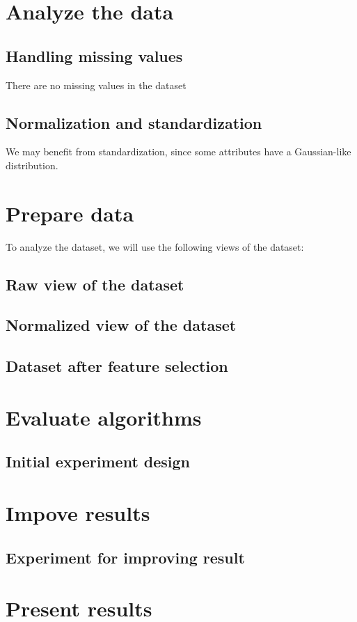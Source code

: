 \chapter{Analyze the data}
\section{Handling missing values}
There are no missing values in the dataset
\section{Normalization and standardization}
We may benefit from standardization, since some attributes have a Gaussian-like distribution.

\chapter{Prepare data}
To analyze the dataset, we will use the following views of the dataset:
\section{Raw view of the dataset}
\section{Normalized view of the dataset}
\section{Dataset after feature selection}

\chapter{Evaluate algorithms}
\section{Initial experiment design}

\chapter{Impove results}
\section{Experiment for improving result}

\chapter{Present results}